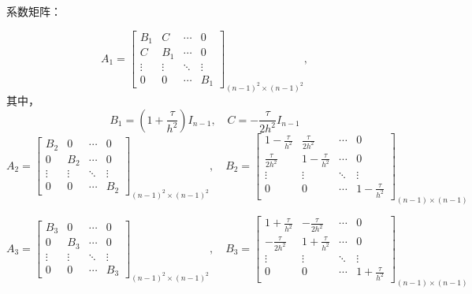 \documentclass[12pt,a4paper]{article}
\begin{document}
系数矩阵：

\begin{equation}
A_1 = \left[                 
\begin{array}{cccc}
B_1& C &\cdots  & 0\\
C& B_1 &\cdots& 0\\
\vdots  & \vdots & \ddots & \vdots \\
0& 0 &\cdots  &B_1
\end{array}
\right ]_{(n-1)^2 \times (n-1)^2},
\end{equation}
其中，
\begin{equation}
 B_1 =(1+\frac{\tau}{h^2}) I_{n-1}  ,\quad C = -\frac{\tau}{2h^2} I_{n-1}
\end{equation}
\newpage
\begin{equation}
A_2 = \left[                 
\begin{array}{cccc}
B_2& 0 &\cdots  & 0\\
0& B_2 &\cdots& 0\\
\vdots  & \vdots & \ddots & \vdots \\
0& 0 &\cdots  &B_2
\end{array}
\right ]_{(n-1)^2 \times (n-1)^2},\quad
B_2 = \left[                 
\begin{array}{cccc}
1-\frac{\tau}{h^2}& \frac{\tau}{2h^2} &\cdots  & 0\\
\frac{\tau}{2h^2}& 1-\frac{\tau}{h^2} &\cdots& 0\\
\vdots  & \vdots & \ddots & \vdots \\
0& 0 &\cdots  &1-\frac{\tau}{h^2}
\end{array}
\right ]_{(n-1) \times (n-1)}
\end{equation}

\begin{equation}
A_3 = \left[                 
\begin{array}{cccc}
B_3& 0 &\cdots  & 0\\
0& B_3 &\cdots& 0\\
\vdots  & \vdots & \ddots & \vdots \\
0& 0 &\cdots  &B_3
\end{array}
\right ]_{(n-1)^2 \times (n-1)^2},\quad
B_3 = \left[                 
\begin{array}{cccc}
1+\frac{\tau}{h^2}& -\frac{\tau}{2h^2} &\cdots  & 0\\
-\frac{\tau}{2h^2}& 1+\frac{\tau}{h^2} &\cdots& 0\\
\vdots  & \vdots & \ddots & \vdots \\
0& 0 &\cdots  &1+\frac{\tau}{h^2}
\end{array}
\right ]_{(n-1) \times (n-1)}
\end{equation}
\end{document}
